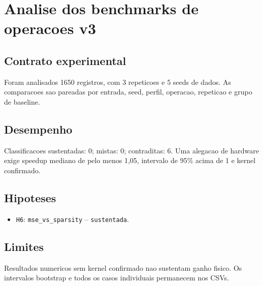 \chapter{Analise dos benchmarks de operacoes v3}
\section{Contrato experimental}
Foram analisados 1650 registros, com 3 repeticoes e 5 seeds de dados.
As comparacoes sao pareadas por entrada, seed, perfil, operacao, repeticao e grupo de baseline.
\section{Desempenho}
Classificacoes sustentadas: 0; mistas: 0; contraditas: 6.
Uma alegacao de hardware exige speedup mediano de pelo menos 1,05, intervalo de 95\% acima de 1 e kernel confirmado.
\section{Hipoteses}
\begin{itemize}
\item \texttt{H6}: \texttt{mse\_vs\_sparsity} -- \texttt{sustentada}.
\end{itemize}
\section{Limites}
Resultados numericos sem kernel confirmado nao sustentam ganho fisico. Os intervalos bootstrap e todos os casos individuais permanecem nos CSVs.
